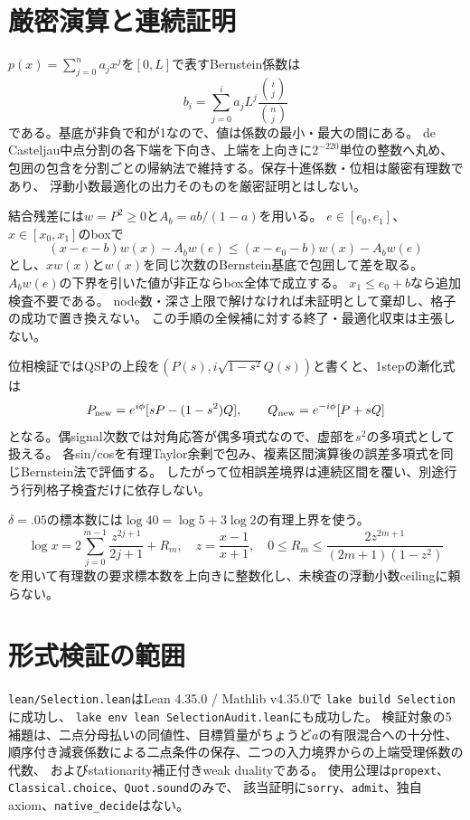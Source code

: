 \section{厳密演算と連続証明}
$p(x)=\sum_{j=0}^na_jx^j$を$[0,L]$で表すBernstein係数は
\[
 b_i=\sum_{j=0}^i a_jL^j\frac{\binom ij}{\binom nj}
\]
である。基底が非負で和が1なので、値は係数の最小・最大の間にある。
de Casteljau中点分割の各下端を下向き、上端を上向きに$2^{-220}$単位の整数へ丸め、
包囲の包含を分割ごとの帰納法で維持する。保存十進係数・位相は厳密有理数であり、
浮動小数最適化の出力そのものを厳密証明とはしない。

結合残差には$w=P^2\geq0$と$A_b=ab/(1-a)$を用いる。
$e\in[e_0,e_1]$、$x\in[x_0,x_1]$のboxで
\[
 (x-e-b)w(x)-A_bw(e)\leq(x-e_0-b)w(x)-A_bw(e)
\]
とし、$xw(x)$と$w(x)$を同じ次数のBernstein基底で包囲して差を取る。
$A_bw(e)$の下界を引いた値が非正ならbox全体で成立する。
$x_1\leq e_0+b$なら追加検査不要である。
node数・深さ上限で解けなければ未証明として棄却し、格子の成功で置き換えない。
この手順の全候補に対する終了・最適化収束は主張しない。

位相検証ではQSPの上段を$(P(s),i\sqrt{1-s^2}Q(s))$と書くと、1stepの漸化式は
\[
 P_{\rm new}=e^{i\phi}[sP-(1-s^2)Q],\qquad
 Q_{\rm new}=e^{-i\phi}[P+sQ]
\]
となる。偶signal次数では対角応答が偶多項式なので、虚部を$s^2$の多項式として扱える。
各sin/cosを有理Taylor余剰で包み、複素区間演算後の誤差多項式を同じBernstein法で評価する。
したがって位相誤差境界は連続区間を覆い、別途行う行列格子検査だけに依存しない。

$\delta=.05$の標本数には$\log40=\log5+3\log2$の有理上界を使う。
\[
 \log x=2\sum_{j=0}^{m-1}\frac{z^{2j+1}}{2j+1}+R_m,\quad
 z=\frac{x-1}{x+1},\quad
 0\leq R_m\leq\frac{2z^{2m+1}}{(2m+1)(1-z^2)}
\]
を用いて有理数の要求標本数を上向きに整数化し、未検査の浮動小数ceilingに頼らない。

\section{形式検証の範囲}
\texttt{lean/Selection.lean}はLean 4.35.0 / Mathlib v4.35.0で
\texttt{lake build Selection}に成功し、
\texttt{lake env lean SelectionAudit.lean}にも成功した。
検証対象の5補題は、二点分母払いの同値性、目標質量がちょうど$a$の有限混合への十分性、
順序付き減衰係数による二点条件の保存、二つの入力境界からの上端受理係数の代数、
およびstationarity補正付きweak dualityである。
使用公理は\texttt{propext}、\texttt{Classical.choice}、\texttt{Quot.sound}のみで、
該当証明に\texttt{sorry}、\texttt{admit}、独自axiom、\texttt{native\_decide}はない。

